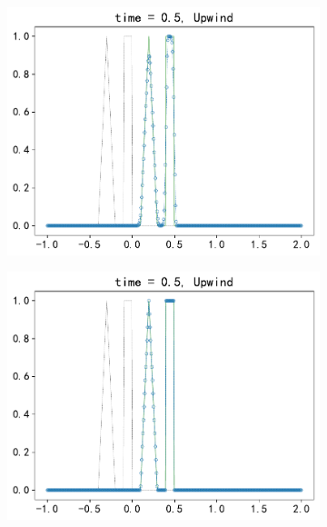 \documentclass[10.5pt
]{article}
\begin{document}
\begin{figure}
\begin{subfigure}{.48\linewidth}
  \includegraphics[width=\textwidth]{figures/problem1_upwind0.95.pdf}
  \caption{}
  \label{fig:problem1-3}
\end{subfigure}
\hfill
\begin{subfigure}{.48\linewidth}
  \includegraphics[width=\textwidth]{figures/problem1_upwind1.0.pdf}
  \caption{}
  \label{fig:problem1-4}
\end{subfigure}
\begin{subfigure}{.48\linewidth}

\end{subfigure}
\end{figure}
\end{document}
